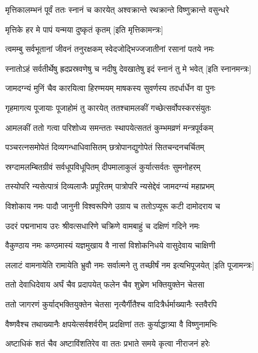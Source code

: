 \twolineshloka
{मृत्तिकालम्भनं पूर्वं ततः स्नानं च कारयेत्}
{अश्वक्रान्ते रथक्रान्ते विष्णुक्रान्ते वसुन्धरे}%

\onelineshloka
{मृत्तिके हर मे पापं यन्मया दुष्कृतं कृतम्}%
[इति मृत्तिकामन्त्रः]

\twolineshloka
{त्वमम्बु सर्वभूतानां जीवनं तनुरक्षकम्}
{स्वेदजोद्भिज्जजातीनां रसानां पतये नमः}%

\twolineshloka
{स्नातोऽहं सर्वतीर्थेषु ह्रदप्रस्रवणेषु च}
{नदीषु देवखातेषु इदं स्नानं तु मे भवेत्}%
[इति स्नानमन्त्रः]

\twolineshloka
{जामदग्न्यं मुनिं चैव कारयित्वा हिरण्मयम्}
{माषकस्य सुवर्णस्य तदर्धार्धेन वा पुनः}%

\twolineshloka
{गृहमागत्य पूजायाः पूजाहोमं तु कारयेत्}
{ततश्चामलकीं गच्छेत्सर्वोपस्करसंयुतः}%

\twolineshloka
{आमलकीं ततो गत्वा परिशोध्य समन्ततः}
{स्थापयेत्सततं कुम्भमव्रणं मन्त्रपूर्वकम्}%

\twolineshloka
{पञ्चरत्नसमोपेतं दिव्यगन्धाधिवासितम्}
{छत्रोपानद्युगोपेतं सितचन्दनचर्चितम्}%

\twolineshloka
{स्रग्दामलम्बितग्रीवं सर्वधूपविधूपितम्}
{दीपमालाकुलं कुर्यात्सर्वतः सुमनोहरम्}%

\twolineshloka
{तस्योपरि न्यसेत्पात्रं दिव्यलाजैः प्रपूरितम्}
{पात्रोपरि न्यसेद्देवं जामदग्न्यं महाप्रभम्}%

\twolineshloka
{विशोकाय नमः पादौ जानुनी विश्वरूपिणे}
{उग्राय च ततोऽप्यूरू कटी दामोदराय च}%

\twolineshloka
{उदरं पद्मनाभाय उरः श्रीवत्सधारिणे}
{चक्रिणे वामबाहुं च दक्षिणं गदिने नमः}%

\twolineshloka
{वैकुण्ठाय नमः कण्ठमास्यं यज्ञमुखाय वै}
{नासां विशोकनिधये वासुदेवाय चाक्षिणी}%

\twolineshloka
{ललाटं वामनायेति रामायेति भ्रुवौ नमः}
{सर्वात्मने तु तच्छीर्षं नम इत्यभिपूजयेत्}%
[इति पूजामन्त्रः]

\twolineshloka
{ततो देवाधिदेवाय अर्घं चैव प्रदापयेत्}
{फलेन चैव शुभ्रेण भक्तियुक्तेन चेतसा}%

\twolineshloka
{ततो जागरणं कुर्याद्भक्तियुक्तेन चेतसा}
{नृत्यैर्गीतैश्च वादित्रैर्धर्माख्यानैः स्तवैरपि}%

\twolineshloka
{वैष्णवैश्च तथाख्यानैः क्षपयेत्सर्वशर्वरीम्}
{प्रदक्षिणां ततः कुर्याद्धात्र्या वै विष्णुनामभिः}%

\twolineshloka
{अष्टाधिकं शतं चैव अष्टाविंशतिरेव वा}
{ततः प्रभाते समये कृत्वा नीराजनं हरेः}%


